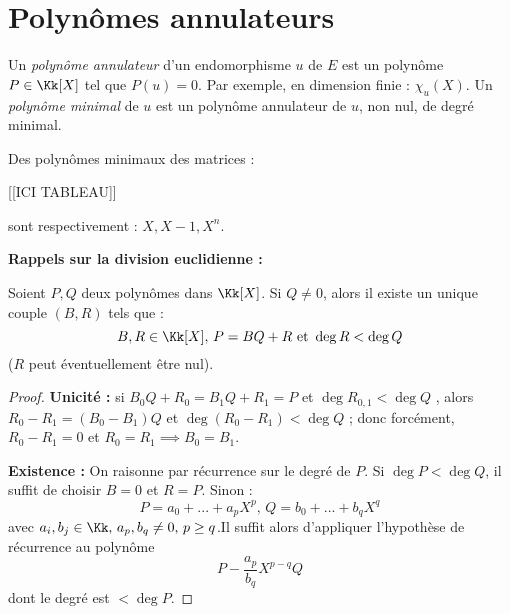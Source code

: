 \documentclass[class=report,crop=false]{standalone}
\begin{document}
\section{Polynômes annulateurs}

Un {\it polynôme annulateur} d'un endomorphisme $u$ de $E$ est un polynôme $P\in \Kk[X]$ tel que $P(u) = 0$. Par exemple, en dimension finie : $\chi_u(X)$. Un {\it polynôme minimal} de $u$  est un polynôme annulateur de $u$, non nul,  de degré minimal.

\begin{exemple}
Des polynômes minimaux des matrices :

[[ICI TABLEAU]]



sont respectivement : $X,X-1,X^n$.
\end{exemple} 

\begin{remarque*}

{\bf Rappels sur la division euclidienne :}

Soient $P,Q$ deux polynômes dans $\Kk[X]$. Si $Q \neq 0$, alors il existe un unique couple $(B,R)$ tels que :
\[B,R \in \Kk[X], \, P=BQ+R \text{ et } \deg R < \deg Q\]
($R$ peut éventuellement être  nul).

\begin{proof}
{\bf Unicité : } si $B_0Q+R_0 = B_1Q+R_1 = P$ et $\deg R_{0,1} < \deg Q$ , alors $R_0-R_1 = (B_0-B_1)Q$ et $\deg (R_0-R_1) < \deg Q$ ; donc forcément, $R_0 -R_1 =0$ et $R_0 = R_1 \implies B_0 =B_1$.

{\bf Existence : } On raisonne par récurrence sur le degré de $P$. Si $\deg P < \deg Q$, il suffit de choisir $B=0$ et $ R =P$. Sinon :
\[P = a_0 + ... + a_pX^p,\, Q = b_0 +...+b_qX^q\]
avec $a_i ,b_j \in \Kk,\, a_p,b_q \neq 0,\, p \ge q $.Il suffit alors d'appliquer l'hypothèse de récurrence au polynôme 
\[P-\frac{a_p}{b_q}X^{p-q}Q\]
dont le degré est $< \deg P$.
\end{proof}

\end{remarque*}
\end{document}
